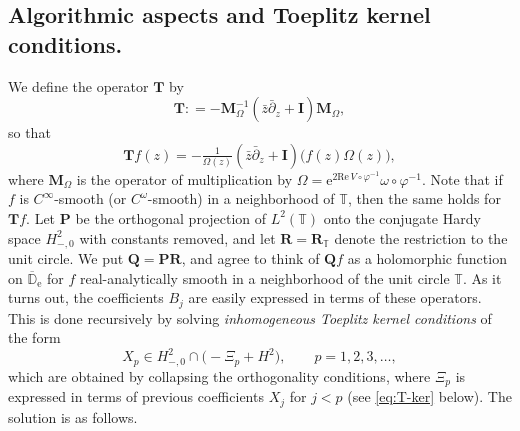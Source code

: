 \documentclass{amsart}
\newcommand{\be}{\begin{equation}}
\newcommand{\ee}{\end{equation}}
\newcommand{\D}{\mathbb{D}}
\newcommand{\T}{\mathbb{T}}
\newcommand{\Pop}{\mathbf{P}}
\newcommand{\Top}{\mathbf{T}}
\newcommand{\Mop}{\mathbf{M}}
\newcommand{\Iop}{\mathbf{I}}
\newcommand{\Qop}{\mathbf{Q}}
\newcommand{\Rop}{\mathbf{R}}
\theoremstyle{definition}
\theoremstyle{remark}
\newcommand{\e}{\mathrm{e}}
\renewcommand{\Re}{\mathrm{Re}\,}
\numberwithin{equation}{subsection}
\begin{document}
\subsection{Algorithmic aspects and Toeplitz kernel conditions.}
\label{ss:thm-coeff}
We define the operator $\Top$ by
\be\label{eq:Top-def-intro}
\Top: =-\Mop_{\Omega}^{-1}(\bar{z}\bar\partial_z+\Iop)\Mop_\Omega,
\ee
so that
\be\label{eq:Top-def-formula}
\Top f(z)=-\tfrac{1}{\Omega(z)}(\bar z\bar\partial_z+\Iop)
\big(f(z)\Omega(z)\big),
\ee
where $\Mop_\Omega$ is the operator of 
multiplication by 
$\Omega=\e^{2\Re V\circ\varphi^{-1}}\omega\circ\varphi^{-1}$.
Note that if $f$ is $C^\infty$-smooth (or $C^\omega$-smooth)
in a neighborhood of $\T$, then the same holds for $\Top f$.
Let $\Pop$ be the orthogonal projection of $L^2(\T)$ 
onto the conjugate Hardy space $H^2_{-,0}$
with constants removed, and let $\Rop=\Rop_\T$ denote the restriction to the 
unit circle. We put $\Qop=\Pop\Rop$, and agree to think of $\Qop f$ as a 
holomorphic function on $\overline{\D}_\e$
for $f$ real-analytically smooth in a neighborhood of the
unit circle $\T$.
As it turns out, the coefficients $B_j$ are easily expressed
in terms of these operators. This is done recursively by
solving {\em inhomogeneous Toeplitz kernel conditions} of the form
\be\label{eq:T-ker-intro}
X_p\in H^2_{-,0}\cap\big(-\Xi_p + H^2\big),\qquad p=1,2,3,\ldots,
\ee
which are obtained by collapsing the orthogonality conditions,
where $\Xi_p$ is expressed in terms of previous coefficients
$X_j$ for $j<p$ (see \eqref{eq:T-ker} below). The solution is as follows.
\end{document}
